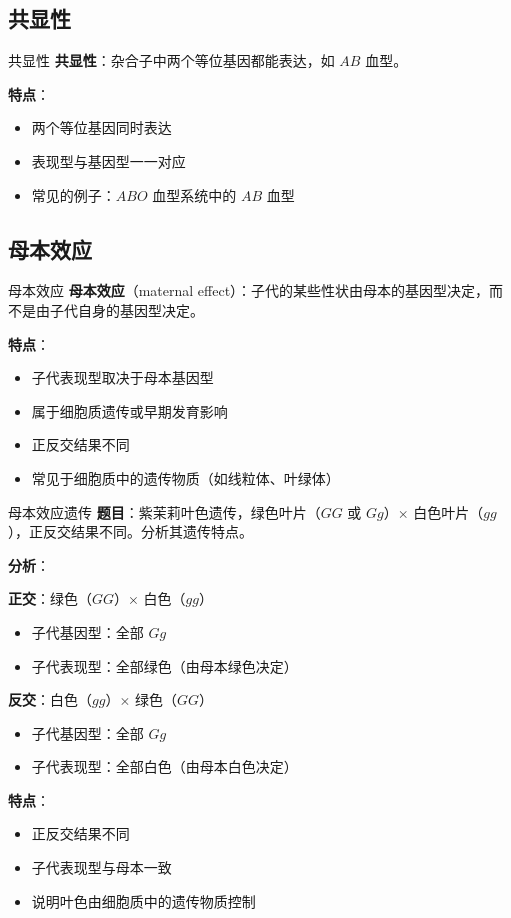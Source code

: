 \documentclass[a4paper,11pt]{ctexart}
\begin{document}
\subsection{共显性}

\begin{definitionbox}{共显性}
\textbf{共显性}：杂合子中两个等位基因都能表达，如 $AB$ 血型。

\textbf{特点}：
\begin{itemize}[leftmargin=2em]
    \item 两个等位基因同时表达
    \item 表现型与基因型一一对应
    \item 常见的例子：$ABO$ 血型系统中的 $AB$ 血型
\end{itemize}
\end{definitionbox}

\subsection{母本效应}

\begin{definitionbox}{母本效应}
\textbf{母本效应}（maternal effect）：子代的某些性状由母本的基因型决定，而不是由子代自身的基因型决定。

\textbf{特点}：
\begin{itemize}[leftmargin=2em]
    \item 子代表现型取决于母本基因型
    \item 属于细胞质遗传或早期发育影响
    \item 正反交结果不同
    \item 常见于细胞质中的遗传物质（如线粒体、叶绿体）
\end{itemize}
\end{definitionbox}

\begin{examplebox}{母本效应遗传}
\textbf{题目}：紫茉莉叶色遗传，绿色叶片（$GG$ 或 $Gg$）$\times$ 白色叶片（$gg$），正反交结果不同。分析其遗传特点。

\textbf{分析}：

\textbf{正交}：绿色（$GG$）$\times$ 白色（$gg$）
\begin{itemize}[leftmargin=2em]
    \item 子代基因型：全部 $Gg$
    \item 子代表现型：全部绿色（由母本绿色决定）
\end{itemize}

\textbf{反交}：白色（$gg$）$\times$ 绿色（$GG$）
\begin{itemize}[leftmargin=2em]
    \item 子代基因型：全部 $Gg$
    \item 子代表现型：全部白色（由母本白色决定）
\end{itemize}

\textbf{特点}：
\begin{itemize}[leftmargin=2em]
    \item 正反交结果不同
    \item 子代表现型与母本一致
    \item 说明叶色由细胞质中的遗传物质控制
\end{itemize}
\end{examplebox}
\end{document}
